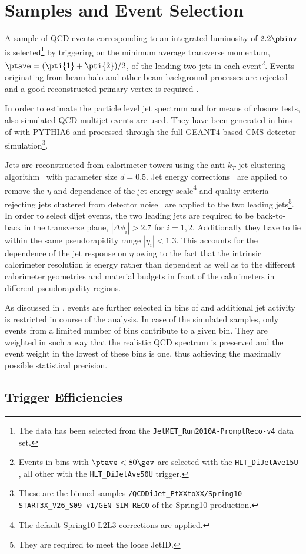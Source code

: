 \section{Samples and Event Selection}\label{sec:ResFit:EvtSel}

A sample of QCD events corresponding to an integrated luminosity of $2.2\pbinv$ is
selected\footnote{The data has been selected from the \texttt{JetMET\_Run2010A-PromptReco-v4} data set.} by triggering on the minimum average transverse momentum, \mbox{$\ptave = (\pti{1} + \pti{2})/2$}, of the leading two jets in each event\footnote{Events in bins with \mbox{$\ptave < 80\gev$} are selected with the \texttt{HLT\_DiJetAve15U} , all other with the \texttt{HLT\_DiJetAve50U} trigger.}.
Events originating from beam-halo and other beam-background processes are rejected~\cite{bib:cmspas:vertex} and a good reconstructed primary vertex is required .

In order to estimate the particle level jet \pt spectrum and for means of closure tests, also simulated QCD multijet events are used.
They have been generated in bins of \pthat with PYTHIA6  and processed through the full GEANT4  based CMS detector simulation\footnote{These are the \pthat binned samples \texttt{/QCDDiJet\_PtXXtoXX/Spring10-START3X\_V26\_S09-v1/GEN-SIM-RECO} of the Spring10 production.}.

Jets are reconstructed from calorimeter towers using the
anti-$k_{T}$ jet clustering algorithm~\cite{bib:akj} with parameter size \mbox{$d=0.5$}.
Jet energy corrections~\cite{bib:cmspas:jec} are applied to remove the 
$\eta$ and \pt dependence of the jet energy scale\footnote{The default Spring10 L2L3 corrections are applied.} and quality criteria rejecting jets clustered from detector noise~\cite{bib:cmspas:jetid} are applied to the
two leading jets\footnote{They are required to meet the loose JetID.}.
In order to select dijet events, the two leading jets are required to be
back-to-back in the transverse plane, \mbox{$|\Delta\phi_{i}| > 2.7$} for \mbox{$i=1,2$}.
Additionally they have to lie within the same pseudorapidity range \mbox{$|\eta_{i}| < 1.3$}.
This accounts for the dependence of the jet \pt response on $\eta$ owing to the fact that the intrinsic calorimeter resolution is energy rather than \pt dependent as well as to the different calorimeter geometries and material budgets in front of the calorimeters in different pseudorapidity regions.

As discussed in , events are further selected in bins of \ptave and additional
jet activity is restricted in course of the analysis.
In case of the simulated samples, only events from a limited number of \pthat bins contribute to a given \ptave bin.
They are weighted in such a way that the realistic QCD \pt spectrum is preserved and the event weight in the lowest of these \pthat bins is one, thus achieving the maximally possible statistical precision.


\subsection{Trigger Efficiencies}
